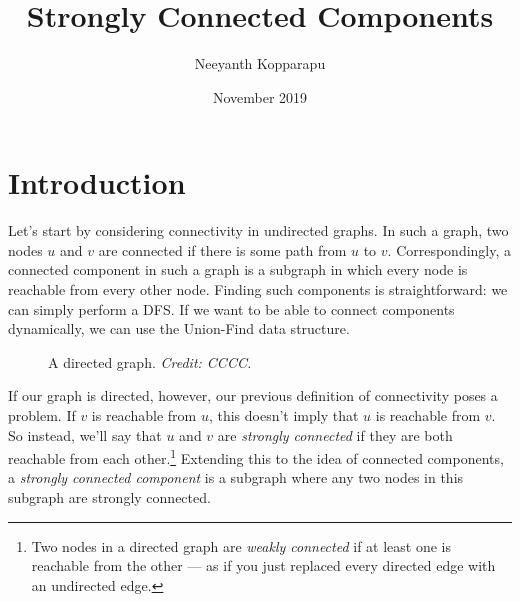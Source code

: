 \documentclass{article}
\title{Strongly Connected Components}
\author{Neeyanth Kopparapu}
\date{November 2019}
\begin{document}
\maketitle

\section{Introduction}

Let's start by considering connectivity in undirected graphs. In such a graph, two nodes $u$ and $v$ are connected if there is some path from $u$ to $v$. Correspondingly, a connected component in such a graph is a subgraph in which every node is reachable from every other node. Finding such components is straightforward: we can simply perform a DFS. If we want to be able to connect components dynamically, we can use the Union-Find data structure.

\begin{figure}[h]
\center
{}
\caption{A directed graph. \textit{Credit: CCCC.}}
\end{figure}

If our graph is directed, however, our previous definition of connectivity poses a problem. If $v$ is reachable from $u$, this doesn't imply that $u$ is reachable from $v$. So instead, we'll say that $u$ and $v$ are \textit{strongly connected} if they are both reachable from each other.\footnote{Two nodes in a directed graph are \textit{weakly connected} if at least one is reachable from the other --- as if you just replaced every directed edge with an undirected edge.} Extending this to the idea of connected components, a \textit{strongly connected component} is a subgraph where any two nodes in this subgraph are strongly connected.
\end{document}
